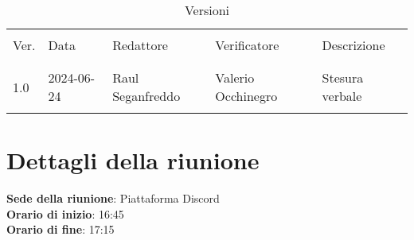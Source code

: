 \documentclass[italian,12pt]{article}
\begin{document}


\newpage



\begin{table}[!h]
	\caption{Versioni}
	\footnotesize
	\begin{center}
		\begin{tabular}{ l l l l p{6cm} }
			\hline                                                                           \\[-2ex]
			Ver. & Data       & Redattore       & Verificatore       & Descrizione           \\
			\\[-2ex] \hline \\[-1.5ex]
			1.0  & 2024-06-24 & Raul Seganfreddo & Valerio Occhinegro & Stesura verbale \\
			\\[-1.5ex] \hline
		\end{tabular}
	\end{center}
\end{table}

\newpage

\tableofcontents

\newpage

\section{Dettagli della riunione}


\textbf{Sede della riunione}: Piattaforma Discord\\
\textbf{Orario di inizio}: 16:45\\
\textbf{Orario di fine}: 17:15\\
\end{document}

